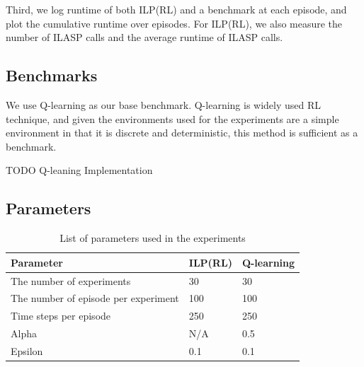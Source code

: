 Third, we log runtime of both ILP(RL) and a benchmark at each episode, and plot the cumulative runtime over episodes.
For ILP(RL), we also measure the number of ILASP calls and the average runtime of ILASP calls. 

\subsection{Benchmarks}
\label{subsec:benchmarks}
We use Q-learning as our base benchmark.
Q-learning is widely used RL technique, and given the environments used for the experiments are a simple environment in that
it is discrete and deterministic, this method is sufficient as a benchmark.

TODO Q-leaning Implementation

\subsection{Parameters}
\begin{table}[!ht!b]
\centering
\begin{tabular}{lll}
\hline
Parameter            & ILP(RL)    & Q-learning      \\ \hline
The number of experiments& 30       & 30       \\
The number of episode per experiment& 100        & 100        \\
Time steps per episode& 250        & 250        \\
Alpha                & N/A       & 0.5       \\
Epsilon              & 0.1        & 0.1        \\
\end{tabular}
\caption{List of parameters used in the experiments}
\label{param}
\end{table}

